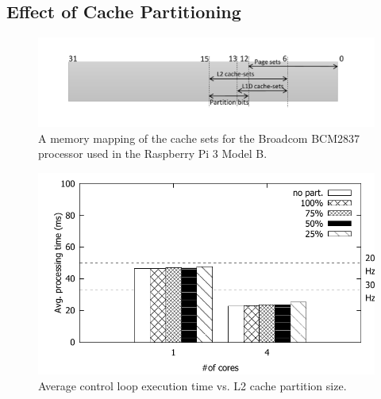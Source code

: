 \subsection{Effect of Cache Partitioning}

\begin{figure}[h]
  \centering
  \includegraphics[width=\textwidth]{figs/cache-mapping}
  \caption{A memory mapping of the cache sets for the Broadcom 
BCM2837 processor used in the Raspberry Pi 3 Model B.}
  \label{fig:cache-mapping}
\end{figure}

\begin{figure}[h]
  \centering
  \includegraphics[width=.7\textwidth]{figs/palloc_multicore}
  \caption{Average control loop execution time vs.  %
    L2 cache partition size.}
  \label{fig:palloc_multicore}
\end{figure}



